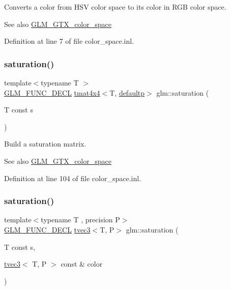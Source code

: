 Converts a color from H\+SV color space to its color in R\+GB color space. \begin{DoxySeeAlso}{See also}
\mbox{\hyperlink{group__gtx__color__space}{G\+L\+M\+\_\+\+G\+T\+X\+\_\+color\+\_\+space}} 
\end{DoxySeeAlso}


Definition at line 7 of file color\+\_\+space.\+inl.

\mbox{\label{group__gtx__color__space_gafecfb15d58da8445103745af3348e516}} 
\subsubsection{\texorpdfstring{saturation()}{saturation()}\hspace{0.1cm}{\footnotesize\ttfamily [1/3]}}
{\footnotesize\ttfamily template$<$typename T $>$ \\
\mbox{\hyperlink{setup_8hpp_ab2d052de21a70539923e9bcbf6e83a51}{G\+L\+M\+\_\+\+F\+U\+N\+C\+\_\+\+D\+E\+CL}} \mbox{\hyperlink{structglm_1_1tmat4x4}{tmat4x4}}$<$T, \mbox{\hyperlink{namespaceglm_a0f04f086094c747d227af4425893f545a9d21ccd8b5a009ec7eb7677befc3bf51}{defaultp}}$>$ glm\+::saturation (\begin{DoxyParamCaption}\item[{T const}]{s }\end{DoxyParamCaption})}

Build a saturation matrix. \begin{DoxySeeAlso}{See also}
\mbox{\hyperlink{group__gtx__color__space}{G\+L\+M\+\_\+\+G\+T\+X\+\_\+color\+\_\+space}} 
\end{DoxySeeAlso}


Definition at line 104 of file color\+\_\+space.\+inl.

\mbox{\label{group__gtx__color__space_ga632ee8dadb44e90a05885f6f8c07d46c}} 
\subsubsection{\texorpdfstring{saturation()}{saturation()}\hspace{0.1cm}{\footnotesize\ttfamily [2/3]}}
{\footnotesize\ttfamily template$<$typename T , precision P$>$ \\
\mbox{\hyperlink{setup_8hpp_ab2d052de21a70539923e9bcbf6e83a51}{G\+L\+M\+\_\+\+F\+U\+N\+C\+\_\+\+D\+E\+CL}} \mbox{\hyperlink{structglm_1_1tvec3}{tvec3}}$<$T, P$>$ glm\+::saturation (\begin{DoxyParamCaption}\item[{T const}]{s,  }\item[{\mbox{\hyperlink{structglm_1_1tvec3}{tvec3}}$<$ T, P $>$ const \&}]{color }\end{DoxyParamCaption})}

